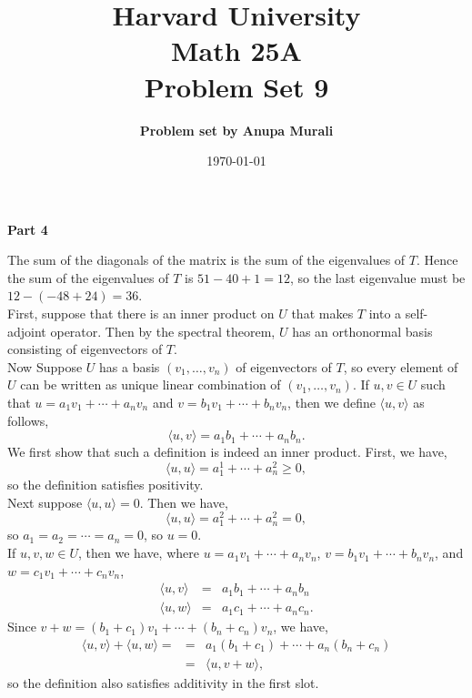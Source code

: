 \documentclass[12pt]{article}
\title{\bf \large Harvard University \\ Math 25A \\ \vspace{0.2in} Problem Set 9}
\author{ \bf \large Problem set by  Anupa Murali}
\date{\today}
\newcommand{\problem}[1]{\vspace{0.3in} \noindent {\bf Problem #1}}
\begin{document}
\maketitle

\thispagestyle{empty}



\vspace{0.35in}

\centerline{\bf \large Part 4}
\problem{1} The sum of the diagonals of the matrix is the sum of the eigenvalues of $T$. Hence the sum of the eigenvalues of $T$ is $51 - 40 + 1 = 12$, so the last eigenvalue must be $12 - (-48 + 24) = \boxed{36}$.\\

\problem{2} First, suppose that there is an inner product on $U$ that makes $T$ into a self-adjoint operator. Then by the spectral theorem, $U$ has an orthonormal basis consisting of eigenvectors of $T$.\\

\noindent
Now  Suppose $U$ has a basis $(v_1, \ldots, v_n)$ of eigenvectors of $T$, so every element of $U$ can be written as unique linear combination of $(v_1, \ldots, v_n)$. If $u, v \in U$ such that $u = a_1v_1 + \cdots + a_nv_n$ and $v = b_1v_1 + \cdots + b_nv_n$, then we define $\langle u, v \rangle$ as follows,
$$
\langle u, v \rangle = a_1b_1 + \cdots + a_nb_n.
$$
We first show that such a definition is indeed an inner product. First, we have,
$$
\langle u, u \rangle = a_1^1 + \cdots + a_n^2 \ge 0,
$$
so the definition satisfies positivity.\\

\noindent
Next suppose $\langle u, u \rangle = 0$. Then we have, 
$$
\langle u, u \rangle =  a_1^2 + \cdots + a_n^2 = 0,
$$
so $a_1 = a_2 = \cdots = a_n = 0$, so $u = 0$.\\

\noindent
If $u, v, w \in U$, then we have, where $u = a_1v_1 + \cdots + a_nv_n$, $v = b_1v_1 + \cdots + b_nv_n$, and $w = c_1v_1 + \cdots + c_nv_n$,\\
\begin{eqnarray*}
\langle u, v \rangle &=& a_1b_1 + \cdots + a_nb_n\\
\langle u, w \rangle &=& a_1c_1 + \cdots + a_nc_n.
\end{eqnarray*}
Since $v + w = (b_1 + c_1)v_1 + \cdots + (b_n + c_n)v_n$, we have,
\begin{eqnarray*}
\langle u, v \rangle + \langle u, w \rangle = &=& a_1(b_1 + c_1) + \cdots + a_n(b_n + c_n)\\ 
&=& \langle u, v + w \rangle,
\end{eqnarray*} 
so the definition also satisfies additivity in the first slot.\\
\end{document}
